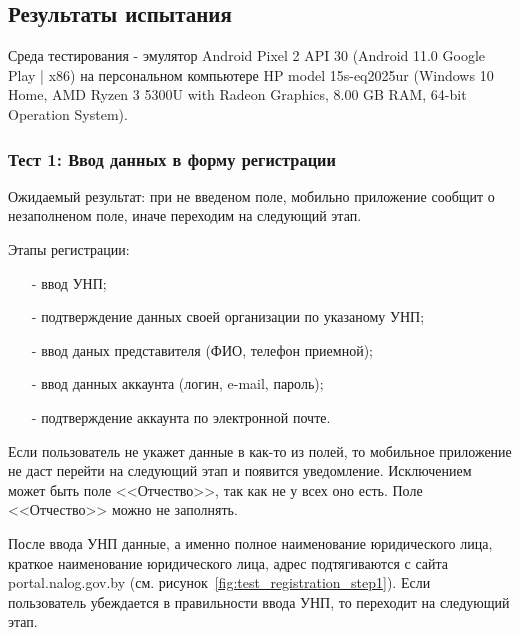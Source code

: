 




\subsection*{Результаты испытания}

Среда тестирования - эмулятор Android Pixel 2 API 30 (Android 11.0 Google Play | x86)
на персональном компьютере HP model 15s-eq2025ur (Windows 10 Home, AMD Ryzen 3 5300U with Radeon Graphics, 8.00 GB RAM, 64-bit Operation System).


\subsubsection*{Тест 1: Ввод данных в форму регистрации}

Ожидаемый результат: при не введеном поле, мобильно приложение сообщит о незаполненом поле, иначе переходим на следующий этап.

Этапы регистрации:
\begin{itemize}
    \item[-] ввод УНП;
    \item[-] подтверждение данных своей организации по указаному УНП;
    \item[-] ввод даных представителя (ФИО, телефон приемной);
    \item[-] ввод данных аккаунта (логин, e-mail, пароль);
    \item[-] подтверждение аккаунта по электронной почте.
\end{itemize}

Если пользователь не укажет данные в как-то из полей, то мобильное приложение не даст перейти на следующий этап
и появится уведомление.
Исключением может быть поле <<Отчество>>, так как не у всех оно есть.
Поле <<Отчество>> можно не заполнять.

После ввода УНП данные, а именно полное наименование юридического лица, краткое наименование юридического лица, адрес
подтягиваются с сайта portal.nalog.gov.by (см. рисунок~\ref{fig:test_registration_step1}).
Если пользователь убеждается в правильности ввода УНП, то переходит на следующий этап.

